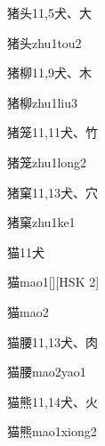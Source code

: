 \begin{entry}{猪头}{11,5}{⽝、⼤}
  \begin{phonetics}{猪头}{zhu1tou2}
  \end{phonetics}
\end{entry}

\begin{entry}{猪柳}{11,9}{⽝、⽊}
  \begin{phonetics}{猪柳}{zhu1liu3}
  \end{phonetics}
\end{entry}

\begin{entry}{猪笼}{11,11}{⽝、⽵}
  \begin{phonetics}{猪笼}{zhu1long2}
  \end{phonetics}
\end{entry}

\begin{entry}{猪窠}{11,13}{⽝、⽳}
  \begin{phonetics}{猪窠}{zhu1ke1}
  \end{phonetics}
\end{entry}

\begin{entry}{猫}{11}{⽝}
  \begin{phonetics}{猫}{mao1}[][HSK 2]
  \end{phonetics}
  \begin{phonetics}{猫}{mao2}
  \end{phonetics}
\end{entry}

\begin{entry}{猫腰}{11,13}{⽝、⾁}
  \begin{phonetics}{猫腰}{mao2yao1}
  \end{phonetics}
\end{entry}

\begin{entry}{猫熊}{11,14}{⽝、⽕}
  \begin{phonetics}{猫熊}{mao1xiong2}
  \end{phonetics}
\end{entry}

